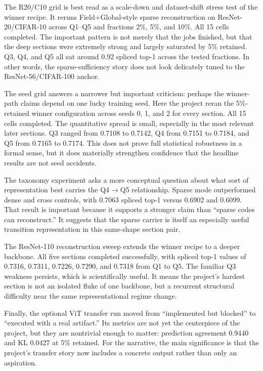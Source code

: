 \documentclass[11pt]{article}
\begin{document}
The R20/C10 grid is best read as a scale-down and dataset-shift stress test of the winner recipe. It reruns Field+Global-style sparse reconstruction on ResNet-20/CIFAR-10 across Q1--Q5 and fractions 2\%, 5\%, and 10\%. All 15 cells completed. The important pattern is not merely that the jobs finished, but that the deep sections were extremely strong and largely saturated by 5\% retained. Q3, Q4, and Q5 all sat around 0.92 spliced top-1 across the tested fractions. In other words, the sparse-sufficiency story does not look delicately tuned to the ResNet-56/CIFAR-100 anchor.

The seed grid answers a narrower but important criticism: perhaps the winner-path claims depend on one lucky training seed. Here the project reran the 5\%-retained winner configuration across seeds 0, 1, and 2 for every section. All 15 cells completed. The quantitative spread is small, especially in the most relevant later sections. Q3 ranged from 0.7108 to 0.7142, Q4 from 0.7151 to 0.7184, and Q5 from 0.7165 to 0.7174. This does not prove full statistical robustness in a formal sense, but it does materially strengthen confidence that the headline results are not seed accidents.

The taxonomy experiment asks a more conceptual question about what sort of representation best carries the Q4$\rightarrow$Q5 relationship. Sparse mode outperformed dense and cross controls, with 0.7063 spliced top-1 versus 0.6902 and 0.6099. That result is important because it supports a stronger claim than ``sparse codes can reconstruct.'' It suggests that the sparse carrier is itself an especially useful transition representation in this same-shape section pair.

The ResNet-110 reconstruction sweep extends the winner recipe to a deeper backbone. All five sections completed successfully, with spliced top-1 values of 0.7316, 0.7311, 0.7226, 0.7290, and 0.7318 from Q1 to Q5. The familiar Q3 weakness persists, which is scientifically useful. It means the project's hardest section is not an isolated fluke of one backbone, but a recurrent structural difficulty near the same representational regime change.

Finally, the optional ViT transfer run moved from ``implemented but blocked'' to ``executed with a real artifact.'' Its metrics are not yet the centerpiece of the project, but they are nontrivial enough to matter: prediction agreement 0.9440 and KL 0.0427 at 5\% retained. For the narrative, the main significance is that the project's transfer story now includes a concrete output rather than only an aspiration.
\end{document}
